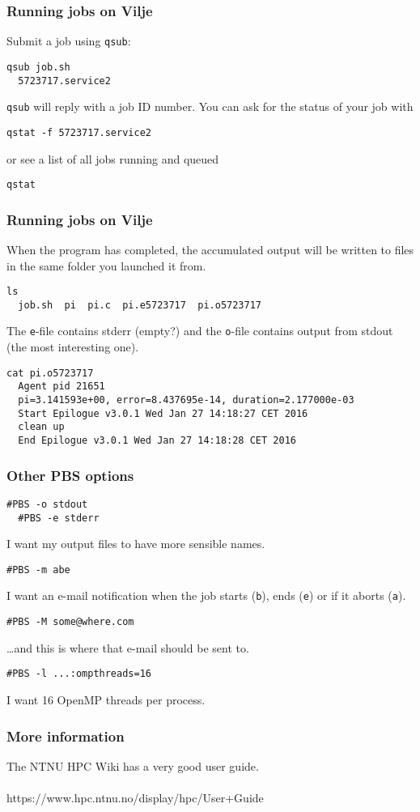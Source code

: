\begin{frame}[fragile]
  \frametitle{Running jobs on Vilje}
  Submit a job using \texttt{qsub}:
\begin{lstlisting}[style=shell]
  qsub job.sh
  5723717.service2
\end{lstlisting}
  \texttt{qsub} will reply with a job ID number. You can ask for the status of
  your job with
\begin{lstlisting}[style=shell]
  qstat -f 5723717.service2
\end{lstlisting}
  or see a list of all jobs running and queued
\begin{lstlisting}[style=shell]
  qstat
\end{lstlisting}
\end{frame}

\begin{frame}[fragile]
  \frametitle{Running jobs on Vilje}
  When the program has completed, the accumulated output will be written to
  files in the same folder you launched it from.
\begin{lstlisting}[style=shell]
  ls
  job.sh  pi  pi.c  pi.e5723717  pi.o5723717
\end{lstlisting}
  The \texttt{e}-file contains stderr (empty?) and the \texttt{o}-file contains
  output from stdout (the most interesting one).
\begin{lstlisting}[style=shell,basicstyle=\ttfamily\footnotesize]
  cat pi.o5723717
  Agent pid 21651
  pi=3.141593e+00, error=8.437695e-14, duration=2.177000e-03
  Start Epilogue v3.0.1 Wed Jan 27 14:18:27 CET 2016
  clean up
  End Epilogue v3.0.1 Wed Jan 27 14:18:28 CET 2016
\end{lstlisting}
\end{frame}

\begin{frame}[fragile]
  \frametitle{Other PBS options}
\begin{lstlisting}[style=shell]
  #PBS -o stdout
  #PBS -e stderr
\end{lstlisting}
I want my output files to have more sensible names.
\begin{lstlisting}[style=shell]
  #PBS -m abe
\end{lstlisting}
I want an e-mail notification when the job starts (\texttt{b}), ends
(\texttt{e}) or if it aborts (\texttt{a}).
\begin{lstlisting}[style=shell]
  #PBS -M some@where.com
\end{lstlisting}
\ldots and this is where that e-mail should be sent to.
\begin{lstlisting}[style=shell]
  #PBS -l ...:ompthreads=16
\end{lstlisting}
I want 16 OpenMP threads per process.
\end{frame}

\begin{frame}
  \frametitle{More information}
  \begin{center}
    The NTNU HPC Wiki has a very good user guide. \\~\\
    https://www.hpc.ntnu.no/display/hpc/User+Guide
  \end{center}
\end{frame}


